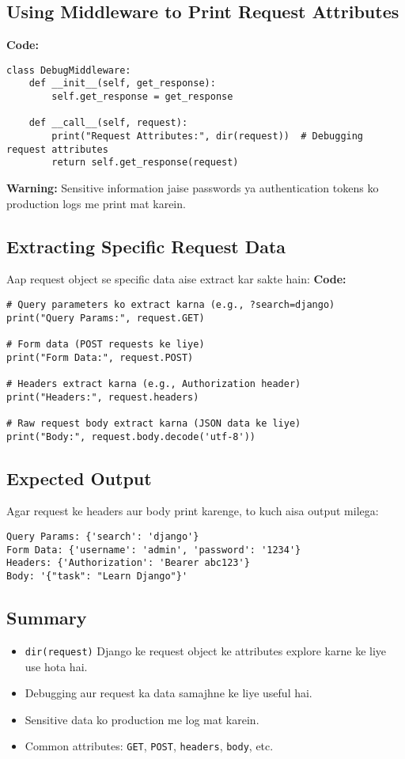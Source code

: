 \documentclass[a4paper]{article}
\begin{document}
\subsection*{\textbf{Using Middleware to Print Request Attributes}}
\textcolor{examplecolor}{\textbf{Code:}}
\begin{lstlisting}
class DebugMiddleware:
    def __init__(self, get_response):
        self.get_response = get_response

    def __call__(self, request):
        print("Request Attributes:", dir(request))  # Debugging request attributes
        return self.get_response(request)
\end{lstlisting}

\vspace{1ex}
\textcolor{warningcolor}{\textbf{Warning:}}
Sensitive information jaise passwords ya authentication tokens ko production logs me print mat karein.

\subsection*{\textbf{Extracting Specific Request Data}}
Aap request object se specific data aise extract kar sakte hain:
\textcolor{examplecolor}{\textbf{Code:}}
\begin{lstlisting}
# Query parameters ko extract karna (e.g., ?search=django)
print("Query Params:", request.GET)

# Form data (POST requests ke liye)
print("Form Data:", request.POST)

# Headers extract karna (e.g., Authorization header)
print("Headers:", request.headers)

# Raw request body extract karna (JSON data ke liye)
print("Body:", request.body.decode('utf-8'))
\end{lstlisting}

\subsection*{\textbf{Expected Output}}
Agar request ke headers aur body print karenge, to kuch aisa output milega:
\begin{lstlisting}
Query Params: {'search': 'django'}
Form Data: {'username': 'admin', 'password': '1234'}
Headers: {'Authorization': 'Bearer abc123'}
Body: '{"task": "Learn Django"}'
\end{lstlisting}

\subsection*{\textbf{Summary}}
\begin{itemize}
    \item \texttt{dir(request)} Django ke request object ke attributes explore karne ke liye use hota hai.
    \item Debugging aur request ka data samajhne ke liye useful hai.
    \item Sensitive data ko production me log mat karein.
    \item Common attributes: \texttt{GET}, \texttt{POST}, \texttt{headers}, \texttt{body}, etc.
\end{itemize}
\end{document}
